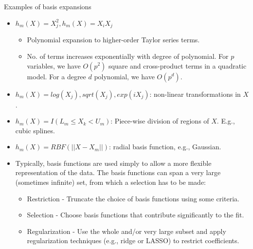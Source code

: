 \documentclass[aspectratio=169]{beamer}
\begin{document}
\begin{frame}{Examples of basis expansions}
    \begin{itemize}
        \item $h_m(X) = X_j^2, h_m(X) = X_i X_j$
        \begin{itemize}
            \item Polynomial expansion to higher-order Taylor series terms.
            \item No. of terms increases exponentially with degree of polynomial. For $p$ variables, we have $O(p^2)$ square and cross-product terms in a quadratic model. For a degree $d$ polynomial, we have $O(p^d)$.
        \end{itemize}
        \item $h_m(X) = log(X_j), sqrt(X_j), exp(i X_j)$: non-linear transformations in $X$.
        \item $h_m(X) = I(L_m \leq X_k < U_m)$: Piece-wise division of regions of $X$. E.g., cubic splines.
        \item $h_m(X) = RBF(||X-X_m||)$: radial basis function, e.g., Gaussian. 
        \item Typically, basis functions are used simply to allow a more flexible representation of the data. The basis functions can span a very large (sometimes infinite) set, from which a selection has to be made:
        \begin{itemize}
            \item Restriction - Truncate the choice of basis functions using some criteria.
            \item Selection - Choose basis functions that contribute significantly to the fit.
            \item Regularization - Use the whole and/or very large subset and apply regularization techniques (e.g., ridge or LASSO) to restrict coefficients.
        \end{itemize}
    \end{itemize}
\end{frame}
\end{document}
